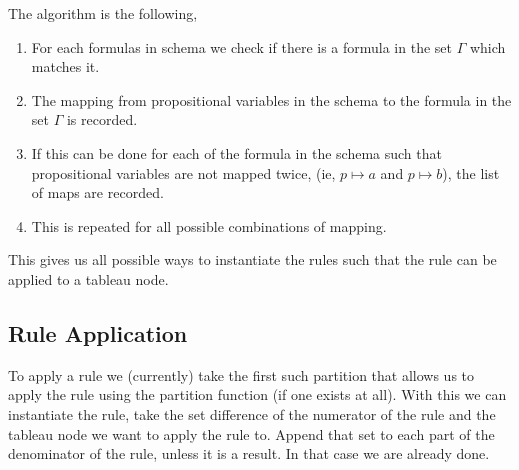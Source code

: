 \documentclass{report}
\begin{document}
The algorithm is the following,

\begin{enumerate}
\item For each formulas in schema we check if there is a formula in the set
$\Gamma$ which matches it.
\item The mapping from propositional variables in the schema to the formula in
the set $\Gamma$ is recorded.
\item If this can be done for each of the formula in the schema such that
propositional variables are not mapped twice, (ie, $p \mapsto a$ and $p \mapsto
b$), the list of maps are recorded.
\item This is repeated for all possible combinations of mapping.
\end{enumerate}

This gives us all possible ways to instantiate the rules such that the rule can
be applied to a tableau node.

\subsection{Rule Application}

To apply a rule we (currently) take the first such partition that allows us to
apply the rule using the partition function (if one exists at all). With this
we can instantiate the rule, take the set difference of the numerator of the
rule and the tableau node we want to apply the rule to. Append that set to each
part of the denominator of the rule, unless it is a result. In that case we are
already done.
\end{document}
